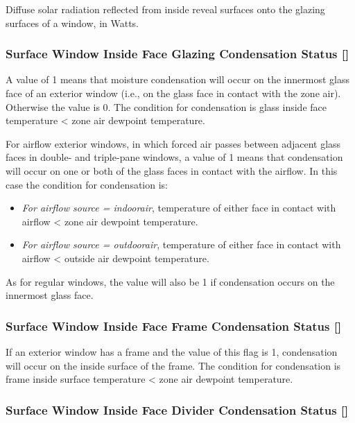 Diffuse solar radiation reflected from inside reveal surfaces onto the glazing surfaces of a window, in Watts.

\subsubsection{Surface Window Inside Face Glazing Condensation Status {[]}}\label{surface-window-inside-face-glazing-condensation-status}

A value of 1 means that moisture condensation will occur on the innermost glass face of an exterior window (i.e., on the glass face in contact with the zone air). Otherwise the value is 0. The condition for condensation is glass inside face temperature \textless{} zone air dewpoint temperature.

For airflow exterior windows, in which forced air passes between adjacent glass faces in double- and triple-pane windows, a value of 1 means that condensation will occur on one or both of the glass faces in contact with the airflow. In this case the condition for condensation is:

\begin{itemize}
\item
  \emph{For airflow source = indoorair}, temperature of either face in contact with airflow \textless{} zone air dewpoint temperature.
\item
  \emph{For airflow source = outdoorair}, temperature of either face in contact with airflow \textless{} outside air dewpoint temperature.
\end{itemize}

As for regular windows, the value will also be 1 if condensation occurs on the innermost glass face.

\subsubsection{Surface Window Inside Face Frame Condensation Status {[]}}\label{surface-window-inside-face-frame-condensation-status}

If an exterior window has a frame and the value of this flag is 1, condensation will occur on the inside surface of the frame. The condition for condensation is frame inside surface temperature \textless{} zone air dewpoint temperature.

\subsubsection{Surface Window Inside Face Divider Condensation Status {[]}}\label{surface-window-inside-face-divider-condensation-status}

